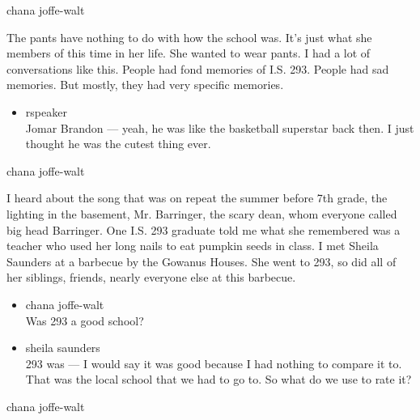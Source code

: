 chana joffe-walt

The pants have nothing to do with how the school was. It's just what she
members of this time in her life. She wanted to wear pants. I had a lot
of conversations like this. People had fond memories of I.S. 293. People
had sad memories. But mostly, they had very specific memories.

\begin{itemize}
\tightlist
\item
  rspeaker\\
  Jomar Brandon --- yeah, he was like the basketball superstar back
  then. I just thought he was the cutest thing ever.
\end{itemize}

chana joffe-walt

I heard about the song that was on repeat the summer before 7th grade,
the lighting in the basement, Mr. Barringer, the scary dean, whom
everyone called big head Barringer. One I.S. 293 graduate told me what
she remembered was a teacher who used her long nails to eat pumpkin
seeds in class. I met Sheila Saunders at a barbecue by the Gowanus
Houses. She went to 293, so did all of her siblings, friends, nearly
everyone else at this barbecue.

\begin{itemize}
\item
  chana joffe-walt\\
  Was 293 a good school?
\item
  sheila saunders\\
  293 was --- I would say it was good because I had nothing to compare
  it to. That was the local school that we had to go to. So what do we
  use to rate it?
\end{itemize}

chana joffe-walt

